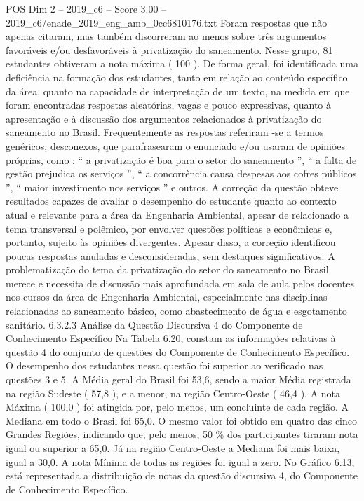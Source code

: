 \begin{textsample}{POS Dim 2 – 2019\_c6 – Score 3.00 – 2019\_c6/enade\_2019\_eng\_amb\_0cc6810176.txt}
Foram respostas que não apenas citaram, mas também discorreram ao menos sobre três argumentos favoráveis e/ou desfavoráveis à privatização do saneamento.
Nesse grupo, 81 estudantes obtiveram a nota máxima ( 100 ).
De forma geral, foi identificada uma deficiência na formação dos estudantes, tanto em relação ao conteúdo específico da área, quanto na capacidade de interpretação de um texto, na medida em que foram encontradas respostas aleatórias, vagas e pouco expressivas, quanto à apresentação e à discussão dos argumentos relacionados à privatização do saneamento no Brasil.
Frequentemente as respostas referiram -se a termos genéricos, desconexos, que parafrasearam o enunciado e/ou usaram de opiniões próprias, como : “ a privatização é boa para o setor do saneamento ”, “ a falta de gestão prejudica os serviços ”, “ a concorrência causa despesas aos cofres públicos ”, “ maior investimento nos serviços ” e outros.
A correção da questão obteve resultados capazes de avaliar o desempenho do estudante quanto ao contexto atual e relevante para a área da Engenharia Ambiental, apesar de relacionado a tema transversal e polêmico, por envolver questões políticas e econômicas e, portanto, sujeito às opiniões divergentes.
Apesar disso, a correção identificou poucas respostas anuladas e desconsideradas, sem destaques significativos.
A problematização do tema da privatização do setor do saneamento no Brasil merece e necessita de discussão mais aprofundada em sala de aula pelos docentes nos cursos da área de Engenharia Ambiental, especialmente nas disciplinas relacionadas ao saneamento básico, como abastecimento de água e esgotamento sanitário. 6.3.2.3 Análise da Questão Discursiva 4 do Componente de Conhecimento Específico Na Tabela 6.20, constam as informações relativas à questão 4 do conjunto de questões do Componente de Conhecimento Específico.
O desempenho dos estudantes nessa questão foi superior ao verificado nas questões 3 e 5.
A Média geral do Brasil foi 53,6, sendo a maior Média registrada na região Sudeste ( 57,8 ), e a menor, na região Centro-Oeste ( 46,4 ).
A nota Máxima ( 100,0 ) foi atingida por, pelo menos, um concluinte de cada região.
A Mediana em todo o Brasil foi 65,0.
O mesmo valor foi obtido em quatro das cinco Grandes Regiões, indicando que, pelo menos, 50 \% dos participantes tiraram nota igual ou superior a 65,0.
Já na região Centro-Oeste a Mediana foi mais baixa, igual a 30,0.
A nota Mínima de todas as regiões foi igual a zero.
No Gráfico 6.13, está representada a distribuição de notas da questão discursiva 4, do Componente de Conhecimento Específico.

\end{textsample}
